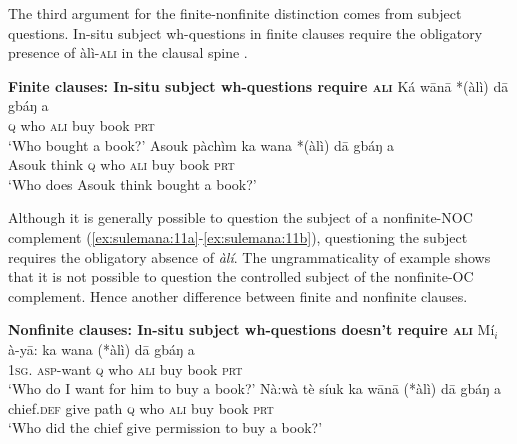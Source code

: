 \documentclass[output=paper,colorlinks,citecolor=brown]{langscibook}
\begin{document}
The third argument for the finite-nonfinite distinction comes from subject questions. In-situ subject wh-questions in finite clauses require the obligatory presence of {àlì-\textsc{ali}} in the clausal spine . 


\ea%
    \label{ex:sulemana:10} 
    {\bf{Finite clauses: In-situ subject wh-questions require \textsc{ali}}}
    \ea%
    \label{ex:sulemana:10a}
    \gll    Ká wānā *(àlì) dā gbáŋ a\\
            \textsc{q} who \textsc{ali} buy book \textsc{prt} \\
    \glt    `Who bought a book?' 
    \ex%
    \gll    Asouk pàchìm ka wana  *(àlì) dā gbáŋ a\\
            Asouk think \textsc{q} who \textsc{ali}  buy book \textsc{prt} \\
    \glt    `Who does Asouk think bought  a book?' 
    \z
\z

Although it is generally possible to question the subject of a nonfinite-NOC complement (\ref{ex:sulemana:11a}-\ref{ex:sulemana:11b}), questioning the subject requires the obligatory absence of {\it{àlí}}. 
The ungrammaticality of example  shows that it is not possible to question the controlled subject of the nonfinite-OC complement. Hence another difference between finite and nonfinite clauses. %

\ea%
    \label{ex:sulemana:11} 
    {\bf{Nonfinite clauses: In-situ subject wh-questions doesn't require \textsc{ali}}}
    \ea%
    \label{ex:sulemana:11a}
    \gll    Mí$_i$ à-yā: ka wana (*àlì) dā gbáŋ a \\
            \textsc{1sg}. \textsc{asp}-want \textsc{q} who  \textsc{ali}  buy book \textsc{prt}  \\
    \glt    `Who do I want for him to buy a book?' 
    \ex%
    \label{ex:sulemana:11b}
    \gll    Nà:wà tè síuk  ka wānā (*àlì) dā gbáŋ a \\
            chief.\textsc{def} give path \textsc{q} who  \textsc{ali} buy book \textsc{prt} \\
    \glt    `Who did the chief give permission to buy a book?' 
    \z
\z
\end{document}
